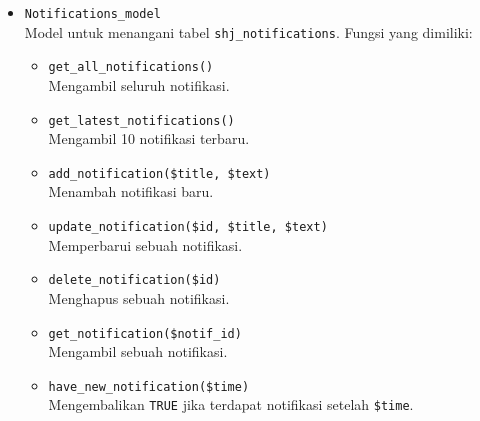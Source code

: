 \begin{itemize}
	\item \verb|Notifications_model| \\ Model untuk menangani tabel \verb|shj_notifications|. Fungsi yang dimiliki:
	\begin{itemize}
	    \item \verb|get_all_notifications()| \\ Mengambil seluruh notifikasi.
	    \item \verb|get_latest_notifications()| \\ Mengambil 10 notifikasi terbaru.
	    \item \verb|add_notification($title, $text)| \\ Menambah notifikasi baru.
	    \item \verb|update_notification($id, $title, $text)| \\ Memperbarui sebuah notifikasi. 
	    \item \verb|delete_notification($id)| \\ Menghapus sebuah notifikasi.
	    \item \verb|get_notification($notif_id)| \\ Mengambil sebuah notifikasi.
	    \item \verb|have_new_notification($time)| \\ Mengembalikan \verb|TRUE| jika terdapat notifikasi setelah \verb|$time|.
	\end{itemize}
	

\end{itemize}
